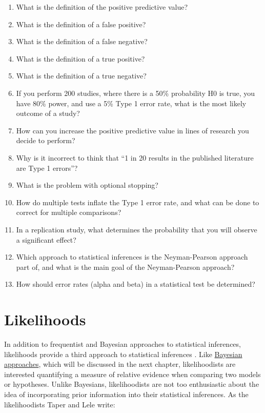 \documentclass[
  oneside]{book}
\begin{document}
\begin{enumerate}
\def\labelenumi{\arabic{enumi}.}
\item
  What is the definition of the positive predictive value?
\item
  What is the definition of a false positive?
\item
  What is the definition of a false negative?
\item
  What is the definition of a true positive?
\item
  What is the definition of a true negative?
\item
  If you perform 200 studies, where there is a 50\% probability H0 is true, you have 80\% power, and use a 5\% Type 1 error rate, what is the most likely outcome of a study?
\item
  How can you increase the positive predictive value in lines of research you decide to perform?
\item
  Why is it incorrect to think that ``1 in 20 results in the published literature are Type 1 errors''?
\item
  What is the problem with optional stopping?
\item
  How do multiple tests inflate the Type 1 error rate, and what can be done to correct for multiple comparisons?
\item
  In a replication study, what determines the probability that you will observe a significant effect?
\item
  Which approach to statistical inferences is the Neyman-Pearson approach part of, and what is the main goal of the Neyman-Pearson approach?
\item
  How should error rates (alpha and beta) in a statistical test be determined?
\end{enumerate}

\hypertarget{likelihoods}{%
\chapter{Likelihoods}\label{likelihoods}}

In addition to frequentist and Bayesian approaches to statistical inferences, likelihoods provide a third approach to statistical inferences \citep{pawitan_all_2001, dienes_understanding_2008}. Like \href{bayes}{Bayesian approaches}, which will be discussed in the next chapter, likelihoodists are interested quantifying a measure of relative evidence when comparing two models or hypotheses. Unlike Bayesians, likelihoodists are not too enthusiastic about the idea of incorporating prior information into their statistical inferences. As the likelihoodists Taper and Lele \citeyearpar{taper_philosophy_2011} write:
\end{document}
